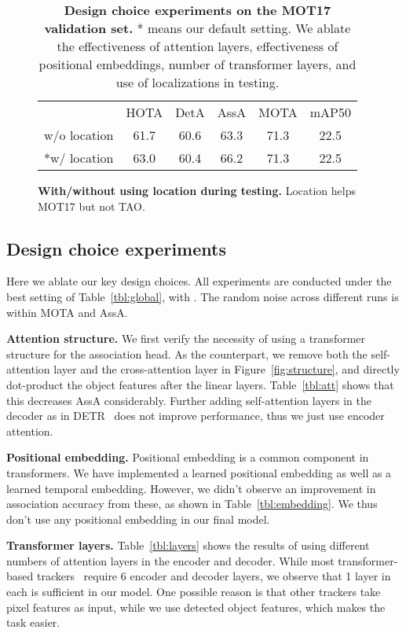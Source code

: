\documentclass[10pt,twocolumn,letterpaper]{article}
\let\oldsubsection\subsection
\renewcommand{\subsection}[1]{\vspace{-1mm}\oldsubsection{#1}\vspace{-1mm}}
\newcommand{\reffig}[1]{Figure~\ref{fig:#1}}
\newcommand{\reftbl}[1]{Table~\ref{tbl:#1}}
\newcommand{\lblsec}[1]{\label{sec:#1}}
\newcommand{\lbltbl}[1]{\label{tbl:#1}}
\begin{document}
\begin{table*}
\begin{subfigure}{0.51\linewidth}
\begin{tabular}{@{}l@{}c@{\ \ }c@{\ \ }c@{\ \ }c@{\ \ }c@{}}
 & HOTA & DetA & AssA & MOTA & mAP50\\
\cmidrule(r){1-1}
\cmidrule(r){2-5}
\cmidrule(){6-6}
w/o location & 61.7 & 60.6 & 63.3 & 71.3 & 22.5\\
*w/ location & 63.0 & 60.4 & 66.2 & 71.3 & 22.5\\
\bottomrule
\end{tabular}
\caption{\scriptsize  \textbf{With/without using location during testing.} Location helps MOT17 but not TAO.}
\lbltbl{loc}
\end{subfigure}
\vspace{-2mm}
\caption{\textbf{Design choice experiments on the MOT17 validation set.} * means our default setting. We ablate the effectiveness of attention layers, effectiveness of positional embeddings, number of transformer layers, and use of localizations in testing.}
\vspace{-6mm}
\end{table*}

\subsection{Design choice experiments}
\lblsec{ablation}

Here we ablate our key design choices. All experiments are conducted under the best setting of \reftbl{global}, with . The random noise across different runs is within  MOTA and  AssA.

\par \noindent \textbf{Attention structure.}
We first verify the necessity of using a transformer structure for the association head.
As the counterpart, we remove both the self-attention layer and the cross-attention layer in \reffig{structure}, and directly dot-product the object features after the linear layers. \reftbl{att} shows that this decreases AssA considerably.
Further adding self-attention layers in the decoder as in DETR~\cite{carion2020end} does not improve performance, thus we just use encoder attention.

\par \noindent \textbf{Positional embedding.}
Positional embedding is a common component in transformers. We have implemented a learned positional embedding as well as a learned temporal embedding.
However, we didn't observe an improvement in association accuracy from these, as shown in \reftbl{embedding}.
We thus don't use any positional embedding in our final model.

\par \noindent \textbf{Transformer layers.} 
\reftbl{layers} shows the results of using different numbers of attention layers in the encoder and decoder. While most transformer-based trackers~\cite{transtrack,meinhardt2021trackformer} require 6 encoder and decoder layers, we observe that 1 layer in each is sufficient in our model.
One possible reason is that other trackers take pixel features as input, while we use detected object features, which makes the task easier.
\end{document}
